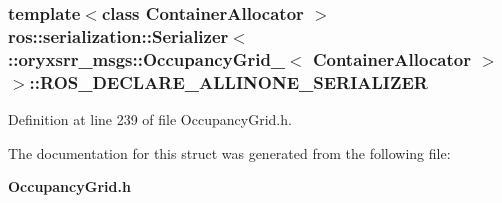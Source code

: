 \subsubsection[{\-R\-O\-S\-\_\-\-D\-E\-C\-L\-A\-R\-E\-\_\-\-A\-L\-L\-I\-N\-O\-N\-E\-\_\-\-S\-E\-R\-I\-A\-L\-I\-Z\-E\-R}]{\setlength{\rightskip}{0pt plus 5cm}template$<$class Container\-Allocator $>$ ros\-::serialization\-::\-Serializer$<$ \-::{\bf oryxsrr\-\_\-msgs\-::\-Occupancy\-Grid\-\_\-}$<$ \-Container\-Allocator $>$ $>$\-::{\bf \-R\-O\-S\-\_\-\-D\-E\-C\-L\-A\-R\-E\-\_\-\-A\-L\-L\-I\-N\-O\-N\-E\-\_\-\-S\-E\-R\-I\-A\-L\-I\-Z\-E\-R}}\label{structros_1_1serialization_1_1Serializer_3_01_1_1oryxsrr__msgs_1_1OccupancyGrid___3_01ContainerAllocator_01_4_01_4_a9799d9141abb5b4f553b1a795123d9d5}


\-Definition at line 239 of file \-Occupancy\-Grid.\-h.



\-The documentation for this struct was generated from the following file\-:\begin{DoxyCompactItemize}
\item 
{\bf \-Occupancy\-Grid.\-h}\end{DoxyCompactItemize}
